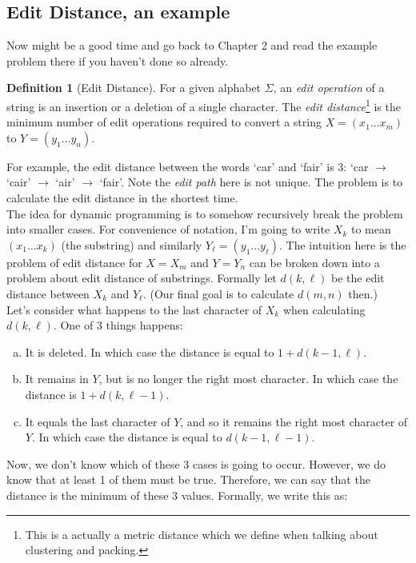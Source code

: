\documentclass[10pt]{article}
\theoremstyle{plain}
\theoremstyle{definition}
\newtheorem{defn}[thm]{Definition} %
\numberwithin{equation}{section}
\numberwithin{figure}{section}
\begin{document}
\subsection{Edit Distance, an example}
Now might be a good time and go back to Chapter 2 and read the example problem there if you haven't done so already. 

\begin{defn}[Edit Distance]
For a given alphabet $\Sigma$, an \emph{edit operation} of a string is an insertion or a deletion of a single character. The \emph{edit distance}\footnote{This is a actually a metric distance which we define when talking about clustering and packing.} is the minimum number of edit operations required to convert a string $X = (x_1 \ldots x_m)$ to $Y = (y_1 \ldots y_n)$.
\end{defn}

\noindent For example, the edit distance between the words `car' and `fair' is 3: `car $\rightarrow$ `cair' $\rightarrow$ `air' $\rightarrow$ `fair'. Note the \emph{edit path} here is not unique. The problem is to calculate the edit distance in the shortest time. \\

\noindent The idea for dynamic programming is to somehow recursively break the problem into smaller cases. For convenience of notation, I'm going to write $X_k$ to mean $(x_1 \ldots x_k)$ (the substring) and similarly $Y_\ell = (y_1 \ldots y_\ell)$. The intuition here is the problem of edit distance for $X = X_m$ and $Y = Y_n$ can be broken down into a problem about edit distance of substrings. Formally let $d(k,\ell)$ be the edit distance between $X_k$ and $Y_\ell$. (Our final goal is to calculate $d(m,n)$ then.)\\

\noindent Let's consider what happens to the last character of $X_k$ when calculating $d(k,\ell)$. One of 3 things happens:
\begin{enumerate}[(a)]
\item It is deleted. In which case the distance is equal to $1 + d(k-1,\ell)$.
\item It remains in $Y$, but is no longer the right most character. In which case the distance is $1 + d(k, \ell-1)$.
\item It equals the last character of $Y$, and so it remains the right most character of $Y$. In which case the distance is equal to $d(k-1,\ell-1)$.
\end{enumerate}

\noindent Now, we don't know which of these 3 cases is going to occur. However, we do know that at least 1 of them must be true. Therefore, we can say that the distance is the minimum of these 3 values. Formally, we write this as:
\end{document}
